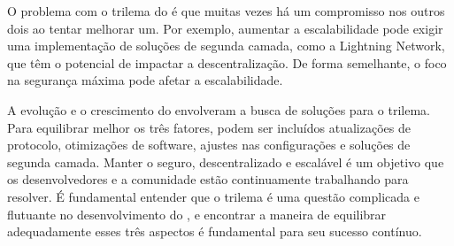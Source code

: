 \documentclass[a4paper,12pt]{article}
\newcommand{\printingbibliography}{%

    \pagestyle{myheadings}
    \markright{}
    \sloppy
    \printbibliography[heading=bibintoc, %
                   title=Refer\^encias %
                  ]
    \fussy%
}
\begin{document}
O problema com o trilema do \btcspace é que muitas vezes há um compromisso nos outros dois 
ao tentar melhorar um. Por exemplo, aumentar a escalabilidade pode exigir uma implementação 
de soluções de segunda camada, como a Lightning Network, que têm o potencial de impactar a
descentralização. De forma semelhante, o foco na segurança máxima pode afetar a escalabilidade.

A evolução e o crescimento do \btcspace envolveram a busca de soluções para o trilema. 
Para equilibrar melhor os três fatores, podem ser incluídos atualizações de protocolo, 
otimizações de software, ajustes nas configurações e soluções de segunda camada. Manter o \btcspace seguro, 
descentralizado e escalável é um objetivo que os desenvolvedores e a comunidade estão continuamente 
trabalhando para resolver. É fundamental entender que o trilema é uma questão complicada e flutuante 
no desenvolvimento do \btc, e encontrar a maneira de equilibrar adequadamente esses três aspectos é 
fundamental para seu sucesso contínuo.


\printingbibliography
\end{document}
